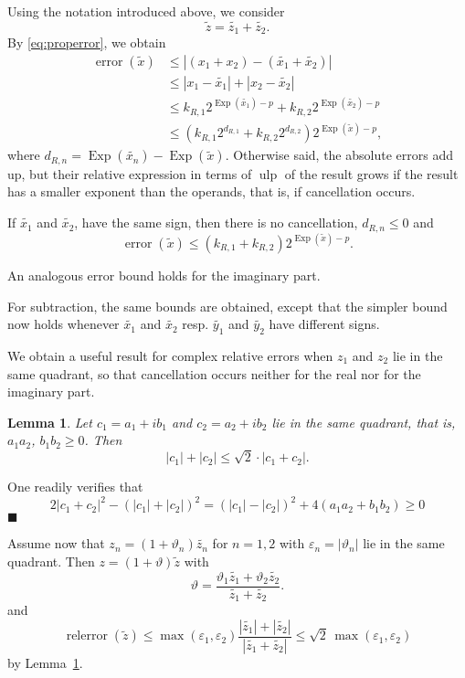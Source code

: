 \documentclass [11pt]{article}
\newcommand {\corr}[1]{{#1}}
\newcommand {\appro}[1]{\widetilde {#1}}
\newcommand {\Ulp}{{\operatorname {ulp}}}
\DeclareMathOperator{\Exp}{\operatorname {Exp}}
\newcommand{\error}{\operatorname {error}}
\newcommand{\relerror}{\operatorname {relerror}}
\renewcommand {\epsilon}{\varepsilon}
\renewcommand {\theta}{\vartheta}
\renewcommand {\leq}{\leqslant}
\renewcommand {\geq}{\geqslant}
\newtheorem{lemma}[theorem]{Lemma}
\newenvironment{proof}{\noindent{\bf Proof:}}{{\hspace* {\fill}$\blacksquare$}}
\begin{document}
Using the notation introduced above, we consider
\[
\appro z = \appro {z_1} + \appro {z_2}.
\]
By \eqref {eq:properror}, we obtain
\begin{align*}
\error (\appro x)
& \leq | (\corr {x_1} + \corr {x_2}) - (\appro {x_1} + \appro {x_2})|
\\
& \leq | \corr {x_1} - \appro {x_1} | + | \corr {x_2} - \appro {x_2}|
\\
& \leq k_{R,1} 2^{\Exp (\appro {x_1}) - p}
+ k_{R,2} 2^{\Exp (\appro {x_2}) - p}
\\
& \leq \left( k_{R,1} 2^{d_{R,1}} + k_{R,2} 2^{d_{R,2}} \right)
2^{\Exp (\appro x) - p},
\end{align*}
where $d_{R,n}=\Exp(\appro {x_n})-\Exp(\appro x)$.
Otherwise said, the absolute errors add up, but their relative expression
in terms of $\Ulp$ of the result grows if the result has a smaller
exponent than the operands, that is, if cancellation occurs.

If $\appro {x_1}$ and $\appro {x_2}$, have the same sign, then there
is no cancellation, $d_{R, n} \leq 0$ and
\[
\error (\appro x) \leq (k_{R,1} + k_{R,2}) 2^{\Exp (\appro x) - p}.
\]

An analogous error bound holds for the imaginary part.

For subtraction, the same bounds are obtained, except that the simpler bound
now holds whenever $\appro {x_1}$ and $\appro {x_2}$ resp.
$\appro {y_1}$ and $\appro {y_2}$ have different signs.

We obtain a useful result for complex relative errors when $z_1$ and $z_2$
lie in the same quadrant, so that cancellation occurs neither for the real
nor for the imaginary part.

\begin {lemma}
\label {lm:arithgeom}
Let $c_1 = a_1 + i b_1$ and $c_2 = a_2 + i b_2$ lie in the same quadrant,
that is, $a_1 a_2$, $b_1 b_2 \geq 0$. Then
\[
|c_1| + |c_2| \leq \sqrt 2 \cdot |c_1 + c_2|.
\]
\end {lemma}

\begin {proof}
One readily verifies that
\[
2 |c_1 + c_2|^2 - (|c_1| + |c_2|)^2
= (|c_1| - |c_2|)^2 + 4 (a_1 a_2 + b_1 b_2)
\geq 0
\]
\end {proof}

Assume now that $\corr {z_n} = (1 + \theta_n) \appro {z_n}$ for $n=1,2$
with $\epsilon_n = |\theta_n|$ lie in the same quadrant.
Then
$\corr z = (1 + \theta) \appro z$
with
\[
\theta = \frac {\theta_1 \appro {z_1} + \theta_2 \appro {z_2}}
               {\appro {z_1} + \appro {z_2}}.
\]
and
\begin {equation}
\label {eq:propaddrel}
\relerror (\appro z)
\leq
\max (\epsilon_1, \epsilon_2)
   \frac {|\appro {z_1}| + |\appro {z_2}|}{|\appro {z_1} + \appro {z_2}|}
\leq
\sqrt 2 \, \max (\epsilon_1, \epsilon_2)
\end {equation}
by Lemma~\ref {lm:arithgeom}.
\end{document}
